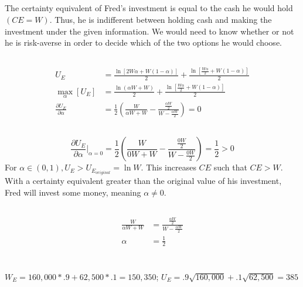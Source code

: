 \documentclass{article}
\begin{document}
	\subsection[d]{}
		The certainty equivalent of Fred's investment is equal to the cash he would hold $(CE=W)$. Thus, he is indifferent between holding cash and making the investment under the given information. We would need to know whether or not he is risk-averse in order to decide which of the two options he would choose.
	\subsection[e]{}
		\begin{align*}
			U_E &= 
			\frac{\ln[2W \alpha+W (1-\alpha)]}{2} + \frac{ \ln \left [ \frac{W \alpha}{2} +W(1-\alpha) \right ]}{2}  \\
			\max_{\alpha} [U_E] &= 
			\frac{\ln (\alpha W + W)}{2} + \frac{ \ln \left [ \frac{W \alpha}{2} + W(1-\alpha) \right ]}{2} \\
			\frac{\partial U_E}{\partial \alpha} &= 
			\frac{1}{2} \left( \frac{W}{\alpha W + W} - \frac{\frac{\alpha W}{2}}{W-\frac{\alpha W}{2}} \right ) = 0
		\end{align*}
	\subsection[f]{}
		$$
			\frac{\partial U_E}{\partial \alpha} \bigg |_{\alpha = 0} = 
			\frac{1}{2} \left( \frac{W}{0 W + W} - \frac{\frac{0 W}{2}}{W-\frac{0 W}{2}} \right )
			= \frac{1}{2} > 0
		$$
		For $ \alpha \in (0,1), U_E > U_{E_{original}} = \ln W $. This increases $CE$ such that $CE>W$. With a certainty equivalent greater than the original value of his investment, Fred will invest some money, meaning $ \alpha \not = 0.$
	\subsection[g]{}
		\begin{align*}
			\frac{W}{\alpha W + W} &= \frac{\frac{\alpha W}{2}}{W-\frac{\alpha W}{2}} \\
			\alpha &= \frac{1}{2}
		\end{align*}

\section[5]{}
	\subsection[a]{}
		$ W_E = 160,000*.9 + 62,500*.1=150,350 $; $U_E = .9 \sqrt{160,000} + .1 \sqrt{62,500} = 385 $
\end{document}
